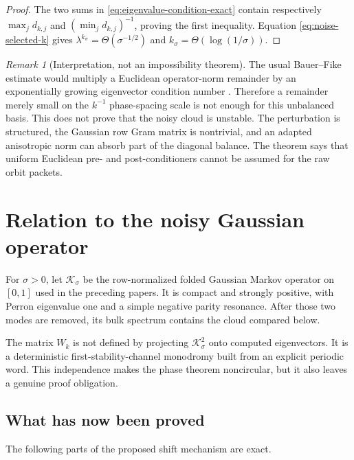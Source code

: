\documentclass[11pt]{article}
\theoremstyle{definition}
\theoremstyle{remark}
\newtheorem{remark}[theorem]{Remark}
\newcommand{\cK}{\mathcal K}
\begin{document}
\begin{proof}
The two sums in \eqref{eq:eigenvalue-condition-exact} contain respectively
$\max_jd_{k,j}$ and $(\min_jd_{k,j})^{-1}$, proving the first inequality.
Equation \eqref{eq:noise-selected-k} gives
$\lambda^{k_\sigma}=\Theta(\sigma^{-1/2})$ and
$k_\sigma=\Theta(\log(1/\sigma))$.
\end{proof}

\begin{remark}[Interpretation, not an impossibility theorem]
\label{rem:not-impossibility}
The usual Bauer--Fike estimate would multiply a Euclidean operator-norm
remainder by an exponentially growing eigenvector condition number
\citep{Kato1995,TrefethenEmbree2005}.  Therefore a remainder merely small on
the $k^{-1}$ phase-spacing scale is not enough for this unbalanced basis.
This does not prove that the noisy cloud is unstable.  The perturbation is
structured, the Gaussian row Gram matrix is nontrivial, and an adapted
anisotropic norm can absorb part of the diagonal balance.  The theorem says
that uniform Euclidean pre- and post-conditioners cannot be assumed for the
raw orbit packets.
\end{remark}

\section{Relation to the noisy Gaussian operator}
\label{sec:noisy-relation}

For $\sigma>0$, let $\cK_\sigma$ be the row-normalized folded Gaussian
Markov operator on $[0,1]$ used in the preceding papers.  It is compact and
strongly positive, with Perron eigenvalue one and a simple negative parity
resonance.  After those two modes are removed, its bulk spectrum contains
the cloud compared below.

The matrix $W_k$ is not defined by projecting $\cK_\sigma^2$ onto computed
eigenvectors.  It is a deterministic first-stability-channel monodromy built
from an explicit periodic word.  This independence makes the phase theorem
noncircular, but it also leaves a genuine proof obligation.

\subsection{What has now been proved}

The following parts of the proposed shift mechanism are exact.
\end{document}
